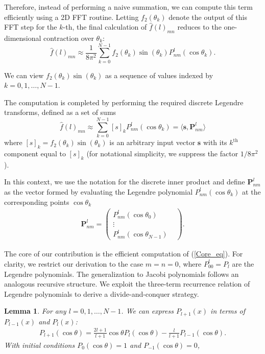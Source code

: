 \documentclass[11pt]{article}
\renewcommand\eqref[1]{(\ref{#1})} %
\newtheorem{lem}[thm]{Lemma}
\theoremstyle{definition}
\theoremstyle{remark}
\numberwithin{equation}{section}
\begin{document}
Therefore, instead of performing a naive summation, we can compute this term efficiently using a 2D FFT routine. Letting $f_2(\theta_k)$ denote the output of this FFT step for the $k$-th, the final calculation of $\hat{f}(l)_{mn}$ reduces to the one-dimensional contraction over $\theta_k$:
\[
    \hat{f}(l)_{mn} \approx \frac{1}{8\pi^2} \sum_{k=0}^{N-1} f_2(\theta_k) \sin(\theta_k) P^l_{nm}(\cos\theta_k).
\]

We can view $f_2(\theta_k) \sin(\theta_k)$ as a sequence of values indexed by $k = 0, 1, \ldots, N - 1$.

The computation is completed by performing the required discrete Legendre transforms, defined as a set of sums
\begin{equation}\label{Core_eq}
    \hat{f}(l)_{mn}\approx\sum_{k=0}^{N-1}[s]_k P^l_{nm}(\cos \theta_k) = \langle \mathbf{s}, \mathbf{P}^l_{nm} \rangle
\end{equation}
where $[s]_k = f_2(\theta_k) \sin(\theta_k)$ is an arbitrary input vector $\mathbf{s}$ with its $k^{\text{th}}$ component equal to $[s]_k$ (for notational simplicity, we suppress the factor $1/8\pi^2$). 



In this context, we use the notation for the discrete inner product and define $\mathbf{P}^l_{nm}$ as the vector formed by evaluating the Legendre polynomial $P^l_{nm}(\cos \theta_k)$ at the corresponding points $\cos \theta_k$
\begin{align*}
    \mathbf{P}_{nm}^l=\begin{pmatrix}
        P_{nm}^l(\cos\theta_0)&\\
        \vdots\\
        P_{nm}^l(\cos\theta_{N-1})
    \end{pmatrix}.
\end{align*}


The core of our contribution is the efficient computation of \eqref{Core_eq}. For clarity, we restrict our derivation to the case $m=n=0$, where $P^l_{00} = P_l$ are the Legendre polynomials. The generalization to Jacobi polynomials follows an analogous recursive structure. We exploit the three-term recurrence relation of Legendre polynomials to derive a divide-and-conquer strategy.


\begin{lem}
For any  $l = 0,1,\ldots,N-1$. We can express $P_{l+1}(x)$ in terms of $P_{l-1}(x)$ and $P_l(x)$:
\begin{align}\label{eq:P_l}
    P_{l+1}(\cos\theta) = \frac{2l+1}{l+1} \cos\theta P_l(\cos\theta) - \frac{l}{l+1} P_{l-1}(\cos\theta).
\end{align}
With initial conditions
$P_0(\cos\theta) = 1$ and $P_{-1}(\cos\theta) = 0$,
\end{lem}
\end{document}
